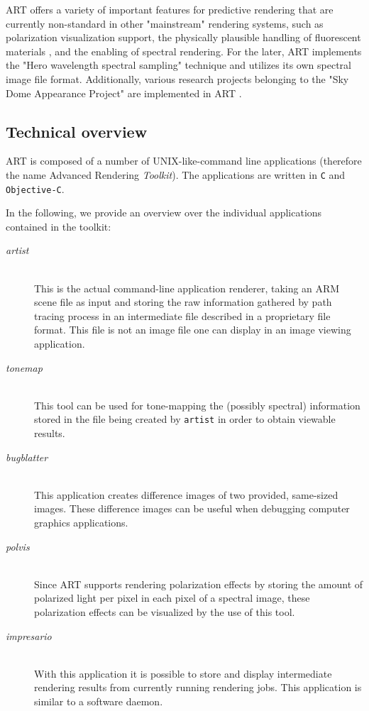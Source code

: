 ART offers a variety of important features for predictive rendering that are currently non-standard in other "mainstream" rendering systems, such as polarization visualization support, the physically plausible handling of fluorescent materials \cite{mojzik2018handling}, and the enabling of spectral rendering. For the later, ART implements the "Hero wavelength spectral sampling" technique \cite{wilkie2014hero} and utilizes its own spectral image file format. Additionally, various research projects belonging to the "Sky Dome Appearance Project" are implemented in ART \cite{hosek2012analytic, hovsek2013adding, wilkie2013predicting}.


\subsection{Technical overview}
ART	is composed of a number of UNIX-like-command line applications (therefore the name Advanced Rendering \emph{Toolkit}). The applications are written in \texttt{C} and \texttt{Objective-C}. 

In the following, we provide an overview over the individual applications contained in the toolkit:
\begin{description}
	\item[\emph{artist}] \hfil \\ This is the actual command-line application renderer, taking an ARM scene file as input and storing the raw information gathered by path tracing process in an intermediate file described in a proprietary file format. This file is not an image file one can display in an image viewing application.
	\item[\emph{tonemap}] \hfil \\ This tool can be used for tone-mapping the (possibly spectral) information stored in the file being created by \texttt{artist} in order to obtain viewable results.
	\item[\emph{bugblatter}] \hfil \\ This application creates difference images of two provided, same-sized images. These difference images can be useful when debugging computer graphics applications.
	\item[\emph{polvis}] \hfil \\ Since ART supports rendering polarization effects by storing the amount of polarized light per pixel in each pixel of a spectral image, these polarization effects can be visualized by the use of this tool.
	\item[\emph{impresario}] \hfil \\ With this application it is possible to store and display intermediate rendering results from currently running rendering jobs. This application is similar to a software daemon.
\end{description}

